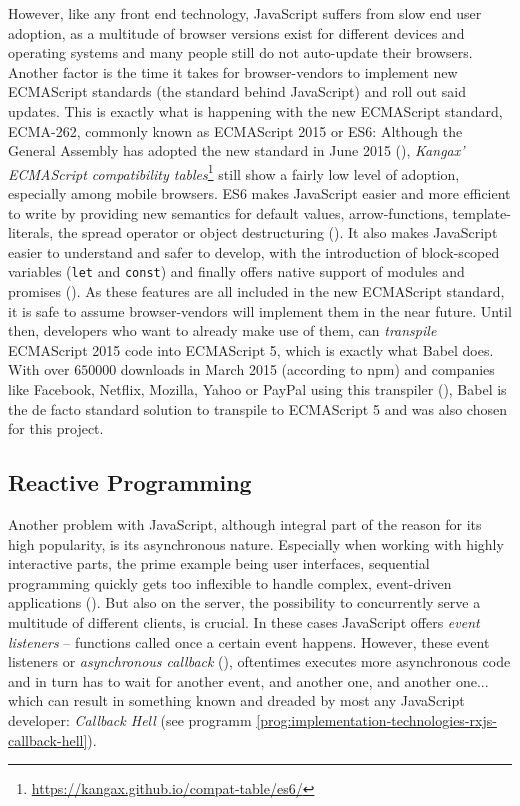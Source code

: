 However, like any front end technology, JavaScript suffers from slow end user adoption, as a multitude of browser versions exist for different devices and operating systems and many people still do not auto-update their browsers. Another factor is the time it takes for browser-vendors to implement new ECMAScript standards (the standard behind JavaScript) and roll out said updates. This is exactly what is happening with the new ECMAScript standard, ECMA-262, commonly known as ECMAScript 2015 or ES6: Although the General Assembly has adopted the new standard in June 2015 (\cite{ecma2015}), \emph{Kangax' ECMAScript compatibility tables}\footnote{\url{https://kangax.github.io/compat-table/es6/}} still show a fairly low level of adoption, especially among mobile browsers. ES6 makes JavaScript easier and more efficient to write by providing new semantics for default values, arrow-functions, template-literals, the spread operator or object destructuring (\cite{es6}). It also makes JavaScript easier to understand and safer to develop, with the introduction of block-scoped variables (\texttt{let} and \texttt{const}) and finally offers native support of modules and promises (\cite{es6}).
As these features are all included in the new ECMAScript standard, it is safe to assume browser-vendors will implement them in the near future. Until then, developers who want to already make use of them, can \emph{transpile} ECMAScript 2015 code into ECMAScript 5, which is exactly what Babel does. With over $650000$ downloads in March 2015 (according to npm) and companies like Facebook, Netflix, Mozilla, Yahoo or PayPal using this transpiler (\cite{babel-users}), Babel is the de facto standard solution to transpile to ECMAScript 5 and was also chosen for this project.

\subsection{Reactive Programming}
\label{sec:implementation-technologies-rxjs}

Another problem with JavaScript, although integral part of the reason for its high popularity, is its asynchronous nature. Especially when working with highly interactive parts, the prime example being user interfaces, sequential programming quickly gets too inflexible to handle complex, event-driven applications (\cite{reactive-programming-survey}). But also on the server, the possibility to concurrently serve a multitude of different clients, is crucial. In these cases JavaScript offers \emph{event listeners} -- functions called once a certain event happens. However, these event listeners or \emph{asynchronous callback} (\cite{reactive-programming-survey}), oftentimes executes more asynchronous code and in turn has to wait for another event, and another one, and another one... which can result in something known and dreaded by most any JavaScript developer: \emph{Callback Hell} (see programm \ref{prog:implementation-technologies-rxjs-callback-hell}).

